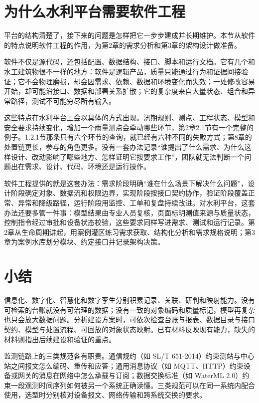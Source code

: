 \section{为什么水利平台需要软件工程}


平台的结构清楚了，接下来的问题是怎样把它一步步建成并长期维护。本节从软件的特点说明软件工程的作用，为第2章的需求分析和第3章的架构设计做准备。


软件不仅是源代码，还包括配置、数据结构、接口、脚本和运行文档。它有几个和水工建筑物很不一样的地方：软件是逻辑产品，质量只能通过行为和证据间接验证；它不会物理磨损，却会因需求、依赖、数据和环境变化而失效；一处修改容易开始，却可能沿接口、数据和部署关系扩散；它的复杂度来自大量状态、组合和异常路径，测试不可能穷尽所有输入。

这些特点在水利平台上会以具体的方式出现。汛期规则、测点、工程状态、模型和安全要求持续变化，增加一个雨量测点会牵动哪些环节，第2章2.1节有一个完整的例子。1.2.1节那条只有六个环节的查询，就已经有六种不同的失败方式；第8章的处置链更长，参与的角色更多。没有一套办法记录“谁提出了什么需求、为什么这样设计、改动影响了哪些地方、怎样证明它按要求工作”，团队就无法判断一个问题出在需求、设计、代码、环境还是运行操作。

软件工程提供的就是这套办法：需求阶段明确“谁在什么场景下解决什么问题”，设计阶段确定对象、数据流和权限边界，实现阶段按接口契约协作，验证阶段覆盖正常、异常和降级路径，运行阶段用监控、工单和复盘持续改进。对水利平台，这套办法还要多管一件事：模型结果由专业人员复核，页面标明测值来源与质量状态，控制指令经过审批和设备状态校验，这些要求同样写进需求、测试和运行记录。第2章从生命周期讲起，用案例灌区练习需求获取、结构化分析和需求规格说明；第3章为案例水库划分模块、约定接口并记录架构决策。

\section*{小结}

信息化、数字化、智慧化和数字孪生分别积累记录、关联、研判和映射能力。没有可检索的台账就没有可治理的数据；没有一致的对象编码和质量标记，模型再复杂也只会放大数据问题。分析建设方案时，可依次检查台账与报表、数据目录与接口契约、模型与处置流程、可回放的对象状态映射。已有材料反映现有能力，缺失的材料则指出后续建设和验证的重点。

监测链路上的三类规范各有职责。通信规约（如 SL/T 651-2014）约束测站与中心站之间报文怎么编码、重传和应答；通用消息协议（如 MQTT、HTTP）约束设备或网关的消息在网络中怎么承载与订阅；数据交换标准（如 WaterML 2.0）约束一段观测时间序列如何被另一个系统正确读懂。三类规范可以在同一系统内配合使用，选型时分别核对设备报文、网络传输和跨系统交换的要求。


